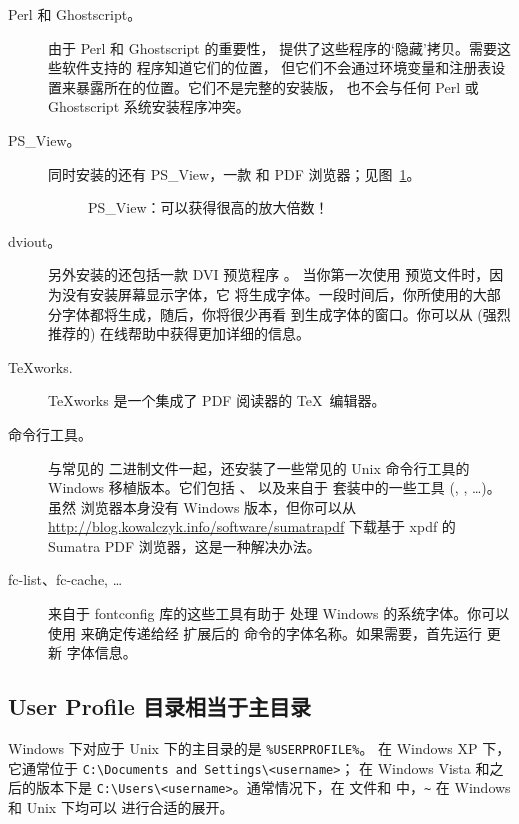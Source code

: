 \documentclass{article}
\begin{document}
\begin{description}
\item[Perl 和 Ghostscript。] 由于 Perl 和  Ghostscript 的重要性，\TL{}
提供了这些程序的`隐藏'拷贝。需要这些软件支持的 \TL{} 程序知道它们的位置，
但它们不会通过环境变量和注册表设置来暴露所在的位置。它们不是完整的安装版，
也不会与任何 Perl 或 Ghostscript 系统安装程序冲突。

\item[PS\_View。] 同时安装的还有 PS\_View，一款 \PS{} 和 PDF
浏览器；见图~\ref{fig:psview}。

\begin{figure}[tb]
\caption{PS\_View：可以获得很高的放大倍数！}\label{fig:psview}
\end{figure}

\item[dviout。] 另外安装的还包括一款 DVI 预览程序 。
当你第一次使用  预览文件时，因为没有安装屏幕显示字体，它
将生成字体。一段时间后，你所使用的大部分字体都将生成，随后，你将很少再看
到生成字体的窗口。你可以从 (强烈推荐的) 在线帮助中获得更加详细的信息。

\item[\TeX{}works.]  \TeX{}works 是一个集成了 PDF 阅读器的
  \TeX\ 编辑器。

\item[命令行工具。] 与常见的 \TL{} 二进制文件一起，还安装了一些常见的
Unix 命令行工具的 Windows 移植版本。它们包括 、
 以及来自于  套装中的一些工具
(, , \ldots)。
虽然  浏览器本身没有 Windows 版本，但你可以从
\url{http://blog.kowalczyk.info/software/sumatrapdf}
下载基于 xpdf 的 Sumatra PDF 浏览器，这是一种解决办法。

\item[fc-list、fc-cache, \ldots] 来自于 fontconfig 库的这些工具有助于 \XeTeX{}
处理 Windows 的系统字体。你可以使用  来确定传递给经 \XeTeX
扩展后的  命令的字体名称。如果需要，首先运行  更新
字体信息。
\end{description}


\subsection{User Profile 目录相当于主目录}
\label{sec:winhome}

Windows 下对应于 Unix 下的主目录的是 \verb|%USERPROFILE%|。
在 Windows XP 下，它通常位于
\verb|C:\Documents and Settings\<username>|；
在 Windows Vista 和之后的版本下是 \verb|C:\Users\<username>|。通常情况下，在
 文件和 \KPS{} 中，\verb|~| 在 Windows 和 Unix 下均可以
进行合适的展开。
\end{document}
